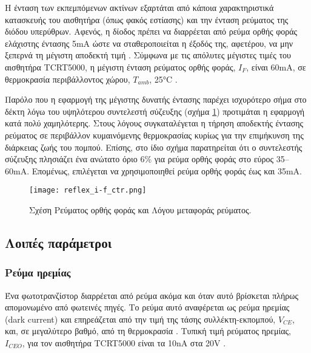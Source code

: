 Η ένταση των εκπεμπόμενων ακτίνων εξαρτάται από κάποια χαρακτηριστικά κατασκευής
του αισθητήρα (όπως φακός εστίασης) και την ένταση ρεύματος της διόδου
υπερύθρων.
Αφενός, η δίοδος πρέπει να διαρρέεται από ρεύμα ορθής φοράς ελάχιστης έντασης
5mA ώστε να σταθεροποιείται η έξοδός της, αφετέρου, να μην ξεπερνά τη μέγιστη
αποδεκτή τιμή \parencite{vishay02}. Σύμφωνα με τις απόλυτες μέγιστες τιμές του
αισθητήρα TCRT5000, η μέγιστη ένταση ρεύματος ορθής φοράς, $I_F$, είναι 60mA, σε
θερμοκρασία περιβάλλοντος χώρου, $T_{amb}$, 25°C \parencite{vishay09}.

Παρόλο που η εφαρμογή της μέγιστης δυνατής έντασης παρέχει ισχυρότερο σήμα στο
δέκτη λόγω του υψηλότερου συντελεστή σύζευξης (σχήμα \ref{fig:reflex:i-f_ctr})
προτιμάται η εφαρμογή κατά πολύ χαμηλότερης. Στους λόγους συγκαταλέγεται η
τήρηση αποδεκτής έντασης ρεύματος σε περιβάλλον κυμαινόμενης θερμοκρασίας κυρίως
για την επιμήκυνση της διάρκειας ζωής του πομπού. Επίσης, στο ίδιο σχήμα
παρατηρείται ότι ο συντελεστής σύζευξης πλησιάζει ένα ανώτατο όριο 6\% για ρεύμα
ορθής φοράς στο εύρος 35--60mA. Επομένως, επιλέγεται να χρησιμοποιηθεί ρεύμα
ορθής φοράς έως και 35mA.

\begin{figure}
    \caption{Σχέση Ρεύματος ορθής φοράς και Λόγου μεταφοράς ρεύματος.
    \label{fig:reflex:i-f_ctr}}
    \begin{center}%
    \texttt{[image: reflex\_i-f\_ctr.png]}
    \end{center}

\end{figure}


\subsection{Λοιπές παράμετροι}


\subsubsection{Ρεύμα ηρεμίας}

Ένα φωτοτρανζίστορ διαρρέεται από ρεύμα ακόμα και όταν αυτό βρίσκεται πλήρως
απομονωμένο από φωτεινές πηγές. Το ρεύμα αυτό αναφέρεται ως ρεύμα ηρεμίας
 (dark current) και επηρεάζεται από την τιμή της
τάσης συλλέκτη-εκπομπού, $V_{CE}$, και, σε μεγαλύτερο βαθμό, από τη θερμοκρασία
\parencite{vishay06}. Τυπική τιμή ρεύματος ηρεμίας, $I_{CEO}$, για τον αισθητήρα
TCRT5000 είναι τα 10nA στα 20V \parencite{vishay09}.

